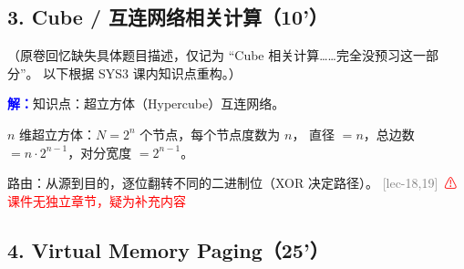\documentclass[11pt,a4paper]{article}
\newcommand{\ans}{\par\noindent\textcolor{blue}{\textbf{解：}}}
\newcommand{\lec}[1]{\textcolor{gray}{[lec-#1]}}
\begin{document}
\subsection*{3. Cube / 互连网络相关计算（10'）}

（原卷回忆缺失具体题目描述，仅记为 ``Cube 相关计算……完全没预习这一部分''。
以下根据 SYS3 课内知识点重构。）

\ans 知识点：超立方体（Hypercube）互连网络。

$n$ 维超立方体：$N = 2^n$ 个节点，每个节点度数为 $n$，
直径 $= n$，总边数 $= n \cdot 2^{n-1}$，对分宽度 $= 2^{n-1}$。

路由：从源到目的，逐位翻转不同的二进制位（XOR 决定路径）。 \lec{18,19}\ \textcolor{red}{⚠ 课件无独立章节，疑为补充内容}

\subsection*{4. Virtual Memory Paging（25'）}
\end{document}
